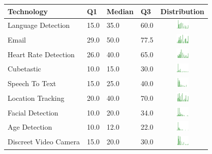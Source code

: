 \begin{table}[t]
\begin{center}
\small
\begin{tabular}{| p{2cm} | p{1cm} | p{1cm} | p{1cm} | c |}
\hline
Technology & Q1 &  Median & Q3 & Distribution  \\ 
\hline
Language Detection  & 15.0 & 35.0 & 60.0 & \includegraphics[width = 2cm, height = 0.5cm]{tables/languagedetectionben} \\ 
Email  & 29.0 & 50.0 & 77.5 & \includegraphics[width = 2cm, height = 0.5cm]{tables/emailben} \\ 
Heart Rate Detection  & 26.0 & 40.0 & 65.0 & \includegraphics[width = 2cm, height = 0.5cm]{tables/heartratedetectionben} \\ 
Cubetastic  & 10.0 & 15.0 & 30.0 & \includegraphics[width = 2cm, height = 0.5cm]{tables/cubetasticben} \\ 
Speech To Text  & 15.0 & 25.0 & 40.0 & \includegraphics[width = 2cm, height = 0.5cm]{tables/speechtotextben} \\ 
Location Tracking  & 20.0 & 40.0 & 70.0 & \includegraphics[width = 2cm, height = 0.5cm]{tables/locationtrackingben} \\ 
Facial Detection  & 10.0 & 20.0 & 34.0 & \includegraphics[width = 2cm, height = 0.5cm]{tables/facialdetectionben} \\ 
Age Detection  & 10.0 & 12.0 & 22.0 & \includegraphics[width = 2cm, height = 0.5cm]{tables/agedetectionben} \\ 
Discreet Video Camera  & 15.0 & 20.0 & 30.0 & \includegraphics[width = 2cm, height = 0.5cm]{tables/discreetvideocameraben} \\ 

\end{tabular}
\end{center}
\end{table}
